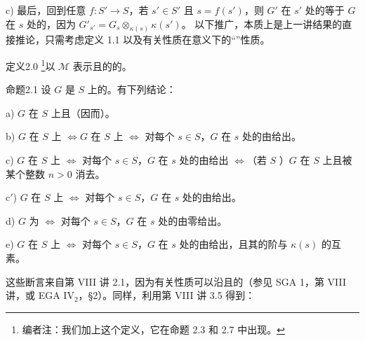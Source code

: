 c) 最后，回到任意 $f:S'\to S$，若 $s'\in S'$ 且 $s=f(s')$，则 $G'$ 在 $s'$ 处的等于 $G$ 在 $s$ 处的，因为 $G'_{s'}=G_s\otimes_{\kappa(s)}\kappa(s')$。
以下推广，本质上是上一讲结果的直接推论，只需考虑定义 1.1 以及有关性质在意义下的“”性质。
\begin{SGAresult}{定义}{2.0}
\footnote{编者注：我们加上这个定义，它在命题 2.3 和 2.7 中出现。}以 $\mathcal M$ 表示且的的。
\end{SGAresult}
\begin{SGAresult}{命题}{2.1}
设 $G$ 是 $S$ 上的。有下列结论：

 a) $G$ 在 $S$ 上且（因而）。

 b) $G$ 在 $S$ 上 $\Longleftrightarrow G$ 在 $S$ 上 $\Longleftrightarrow$ 对每个 $s\in S$，$G$ 在 $s$ 处的由给出。

 c) $G$ 在 $S$ 上 $\Longleftrightarrow$ 对每个 $s\in S$，$G$ 在 $s$ 处的由给出 $\Longleftrightarrow$（若 $S$ ）$G$ 在 $S$ 上且被某个整数 $n>0$ 消去。

 c$'$) $G$ 在 $S$ 上 $\Longleftrightarrow$ 对每个 $s\in S$，$G$ 在 $s$ 处的由给出。

 d) $G$ 为 $\Longleftrightarrow$ 对每个 $s\in S$，$G$ 在 $s$ 处的由零给出。

 e) $G$ 在 $S$ 上 $\Longleftrightarrow$ 对每个 $s\in S$，$G$ 在 $s$ 处的由给出，且其的阶与 $\kappa(s)$ 的互素。
\end{SGAresult}
这些断言来自第 VIII 讲 2.1，因为有关性质可以沿且的（参见 SGA 1，第 VIII 讲，或 EGA IV$_2$，\S2）。同样，利用第 VIII 讲 3.5 得到：
